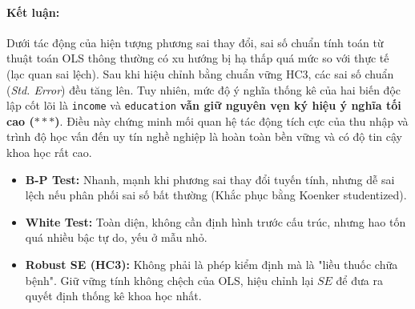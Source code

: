 \documentclass[12pt, a4paper]{article}
\begin{document}
	\paragraph{Kết luận:}
	Dưới tác động của hiện tượng phương sai thay đổi, sai số chuẩn tính toán từ thuật toán OLS thông thường có xu hướng bị hạ thấp quá mức so với thực tế (lạc quan sai lệch). Sau khi hiệu chỉnh bằng chuẩn vững HC3, các sai số chuẩn (\textit{Std. Error}) đều tăng lên. Tuy nhiên, mức độ ý nghĩa thống kê của hai biến độc lập cốt lõi là \texttt{income} và \texttt{education} \textbf{vẫn giữ nguyên vẹn ký hiệu ý nghĩa tối cao ($***$)}. Điều này chứng minh mối quan hệ tác động tích cực của thu nhập và trình độ học vấn đến uy tín nghề nghiệp là hoàn toàn bền vững và có độ tin cậy khoa học rất cao.
	\begin{itemize}
		\item \textbf{B-P Test:} Nhanh, mạnh khi phương sai thay đổi tuyến tính, nhưng dễ sai lệch nếu phân phối sai số bất thường (Khắc phục bằng Koenker studentized).
		\item \textbf{White Test:} Toàn diện, không cần định hình trước cấu trúc, nhưng hao tốn quá nhiều bậc tự do, yếu ở mẫu nhỏ.
		\item \textbf{Robust SE (HC3):} Không phải là phép kiểm định mà là "liều thuốc chữa bệnh". Giữ vững tính không chệch của OLS, hiệu chỉnh lại $SE$ để đưa ra quyết định thống kê khoa học nhất.
	\end{itemize}
\end{document}

